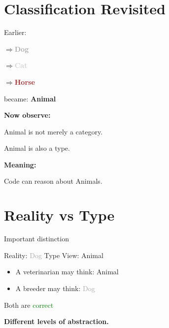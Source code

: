 \documentclass[11pt,a4paper]{book}
\begin{document}

\section{Classification Revisited}

Earlier:

$\Rightarrow$\textcolor{darkgray}{\textbf{Dog}}

$\Rightarrow$\textcolor{lightgray}{\textbf{Cat}}

$\Rightarrow$\textcolor{brown}{\textbf{Horse}}

became:      \textcolor{RosettaSeaGreen}{\textbf{Animal}}



\textbf{Now observe:}

    Animal is not merely a category.

    Animal is also a type.


\textbf{Meaning:}

    Code can reason about Animals.


\section{Reality vs Type}

Important distinction
\newline

Reality: \textcolor{darkgray}{Dog}  Type View: Animal
\begin{itemize}
    \item A veterinarian may think: Animal


    \item A breeder may think: \textcolor{darkgray}{Dog}

\end{itemize}

        Both are \textcolor{green}{correct}

\textbf{Different levels of abstraction.}
\end{document}
